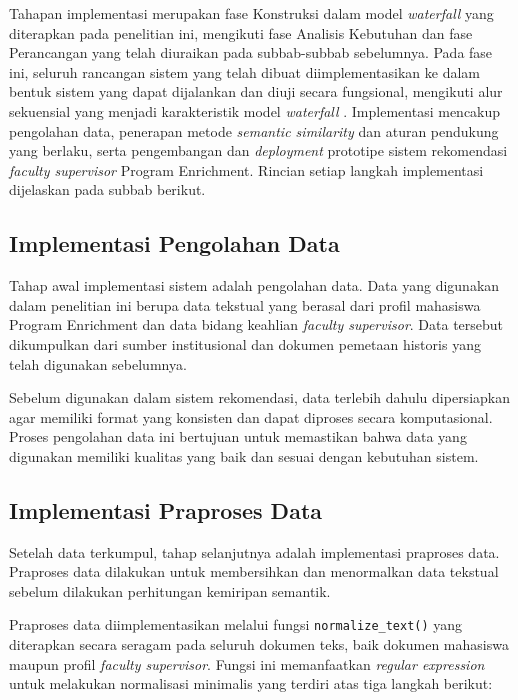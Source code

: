 Tahapan implementasi merupakan fase Konstruksi dalam model \textit{waterfall} yang diterapkan pada penelitian ini, mengikuti fase Analisis Kebutuhan dan fase Perancangan yang telah diuraikan pada subbab-subbab sebelumnya. Pada fase ini, seluruh rancangan sistem yang telah dibuat diimplementasikan ke dalam bentuk sistem yang dapat dijalankan dan diuji secara fungsional, mengikuti alur sekuensial yang menjadi karakteristik model \textit{waterfall} \cite{pressman2010se}. Implementasi mencakup pengolahan data, penerapan metode \textit{semantic similarity} dan aturan pendukung yang berlaku, serta pengembangan dan \textit{deployment} prototipe sistem rekomendasi \textit{faculty supervisor} Program Enrichment. Rincian setiap langkah implementasi dijelaskan pada subbab berikut.

\subsection{Implementasi Pengolahan Data}\label{implementasi-pengolahan-data}

Tahap awal implementasi sistem adalah pengolahan data. Data yang digunakan dalam penelitian ini berupa data tekstual yang berasal dari profil mahasiswa Program Enrichment dan data bidang keahlian \textit{faculty supervisor}. Data tersebut dikumpulkan dari sumber institusional dan dokumen pemetaan historis yang telah digunakan sebelumnya.

Sebelum digunakan dalam sistem rekomendasi, data terlebih dahulu dipersiapkan agar memiliki format yang konsisten dan dapat diproses secara komputasional. Proses pengolahan data ini bertujuan untuk memastikan bahwa data yang digunakan memiliki kualitas yang baik dan sesuai dengan kebutuhan sistem.

\subsection{Implementasi Praproses Data}\label{implementasi-praproses-data}

Setelah data terkumpul, tahap selanjutnya adalah implementasi praproses data. Praproses data dilakukan untuk membersihkan dan menormalkan data tekstual sebelum dilakukan perhitungan kemiripan semantik.

Praproses data diimplementasikan melalui fungsi \texttt{normalize\_text()} yang diterapkan secara seragam pada seluruh dokumen teks, baik dokumen mahasiswa maupun profil \textit{faculty supervisor}. Fungsi ini memanfaatkan \textit{regular expression} untuk melakukan normalisasi minimalis yang terdiri atas tiga langkah berikut:

